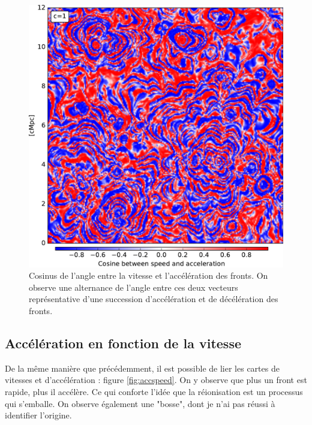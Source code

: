 \begin{figure}
        \includegraphics[width=.95\linewidth]{img/04_mapreio/map_cos_c1.pdf} 
        \caption[Évolution de l'accélération des fronts]{Cosinus de l'angle entre la vitesse et l'accélération des fronts.
        On observe une alternance de l'angle entre ces deux vecteurs représentative d'une succession d'accélération et de décélération des fronts.
\label{fig:cos}}
\end{figure}





\subsection{Accélération en fonction de la vitesse}
De la même manière que précédemment, il est possible de lier les cartes de vitesses et d'accélération : figure \ref{fig:accspeed}.
On y observe que plus un front est rapide, plus il accélère.
Ce qui conforte l'idée que la réionisation est un processus qui s'emballe.
On observe également une "bosse", dont je n'ai pas réussi à identifier l'origine.

